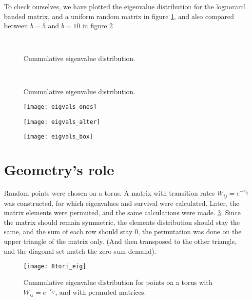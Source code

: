 \documentclass[onecolumn,fleqn]{revtex4}
\begin{document}
To check ourselves, we have plotted the eigenvalue distribution for the lognoraml banded matrix, and a uniform random matrix in figure \ref{fig:eigenvalue_distribution}, and also compared between $b=5$ and $b=10$ in figure \ref{fig:eigenvalue_distribution_5_10}
\begin{figure}
    \\ 
    \caption{Cummulative eigenvalue distribution.}
    \label{fig:eigenvalue_distribution}
\end{figure}
\begin{figure}
    \\ 
    \caption{Cummulative eigenvalue distribution.}
    \label{fig:eigenvalue_distribution_5_10}
\end{figure}
\begin{figure}
    \texttt{[image: eigvals\_ones]}
\end{figure}
\begin{figure}
    \texttt{[image: eigvals\_alter]}
\end{figure}
\begin{figure}
    \texttt{[image: eigvals\_box]}
\end{figure}

\section{Geometry's role} \label{sec:geometry}
Random points were chosen on a torus. A matrix with transition rates $W_{ij} = e^{-r_{ij}}$ was constructed, for which eigenvalues and survival were calculated. Later, the matrix elements were permuted, and the same calculations were made. \ref{fig:distance}. Since the matrix should remain symmetric, the elements distribution should stay the same, and the sum of each row should stay $0$, the permutation was done on the upper triangle of the matrix only. (And then transposed to the other triangle, and the diagonal set match the zero sum demand).
\begin{figure}
    \texttt{[image: 8tori\_eig]}
    \caption{Cummulative eigenvalue distribution for points on a torus with $W_{ij} = e^{-r_{ij}}$, and with permuted matrices.}
    \label{fig:distance}
\end{figure}



\end{document}
